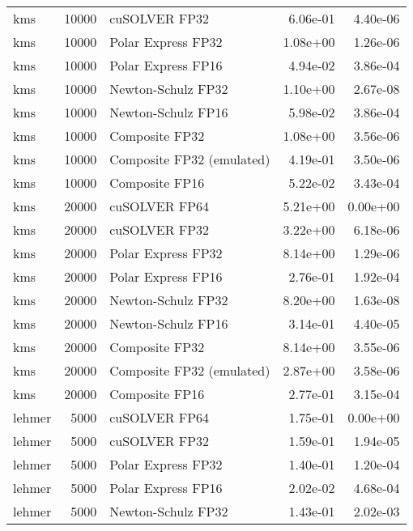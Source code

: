 \begin{table}
\begin{tabular}{lrlrr}
      kms & 10000 &             cuSOLVER FP32 &  6.06e-01 &        4.40e-06 \\
      kms & 10000 &        Polar Express FP32 &  1.08e+00 &        1.26e-06 \\
      kms & 10000 &        Polar Express FP16 &  4.94e-02 &        3.86e-04 \\
      kms & 10000 &        Newton-Schulz FP32 &  1.10e+00 &        2.67e-08 \\
      kms & 10000 &        Newton-Schulz FP16 &  5.98e-02 &        3.86e-04 \\
      kms & 10000 &            Composite FP32 &  1.08e+00 &        3.56e-06 \\
      kms & 10000 & Composite FP32 (emulated) &  4.19e-01 &        3.50e-06 \\
      kms & 10000 &            Composite FP16 &  5.22e-02 &        3.43e-04 \\
      kms & 20000 &             cuSOLVER FP64 &  5.21e+00 &        0.00e+00 \\
      kms & 20000 &             cuSOLVER FP32 &  3.22e+00 &        6.18e-06 \\
      kms & 20000 &        Polar Express FP32 &  8.14e+00 &        1.29e-06 \\
      kms & 20000 &        Polar Express FP16 &  2.76e-01 &        1.92e-04 \\
      kms & 20000 &        Newton-Schulz FP32 &  8.20e+00 &        1.63e-08 \\
      kms & 20000 &        Newton-Schulz FP16 &  3.14e-01 &        4.40e-05 \\
      kms & 20000 &            Composite FP32 &  8.14e+00 &        3.55e-06 \\
      kms & 20000 & Composite FP32 (emulated) &  2.87e+00 &        3.58e-06 \\
      kms & 20000 &            Composite FP16 &  2.77e-01 &        3.15e-04 \\
   lehmer &  5000 &             cuSOLVER FP64 &  1.75e-01 &        0.00e+00 \\
   lehmer &  5000 &             cuSOLVER FP32 &  1.59e-01 &        1.94e-05 \\
   lehmer &  5000 &        Polar Express FP32 &  1.40e-01 &        1.20e-04 \\
   lehmer &  5000 &        Polar Express FP16 &  2.02e-02 &        4.68e-04 \\
   lehmer &  5000 &        Newton-Schulz FP32 &  1.43e-01 &        2.02e-03 \\

\end{tabular}
\end{table}
